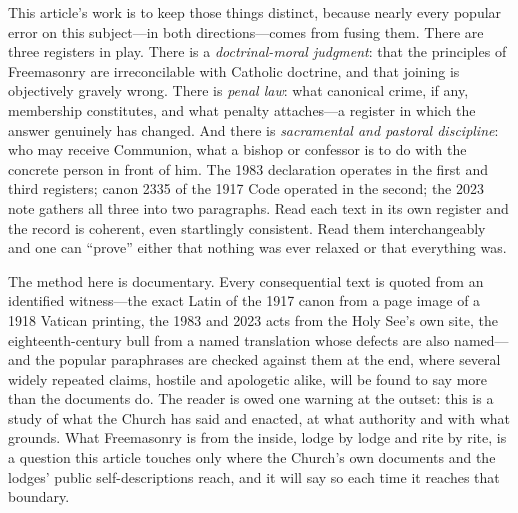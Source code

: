 This article's work is to keep those things distinct, because nearly every popular error on this subject---in both directions---comes from fusing them. There are three registers in play. There is a \emph{doctrinal-moral judgment}: that the principles of Freemasonry are irreconcilable with Catholic doctrine, and that joining is objectively gravely wrong. There is \emph{penal law}: what canonical crime, if any, membership constitutes, and what penalty attaches---a register in which the answer genuinely has changed. And there is \emph{sacramental and pastoral discipline}: who may receive Communion, what a bishop or confessor is to do with the concrete person in front of him. The 1983 declaration operates in the first and third registers; canon 2335 of the 1917 Code operated in the second; the 2023 note gathers all three into two paragraphs. Read each text in its own register and the record is coherent, even startlingly consistent. Read them interchangeably and one can ``prove'' either that nothing was ever relaxed or that everything was.

The method here is documentary. Every consequential text is quoted from an identified witness---the exact Latin of the 1917 canon from a page image of a 1918 Vatican printing, the 1983 and 2023 acts from the Holy See's own site, the eighteenth-century bull from a named translation whose defects are also named---and the popular paraphrases are checked against them at the end, where several widely repeated claims, hostile and apologetic alike, will be found to say more than the documents do. The reader is owed one warning at the outset: this is a study of what the Church has said and enacted, at what authority and with what grounds. What Freemasonry is from the inside, lodge by lodge and rite by rite, is a question this article touches only where the Church's own documents and the lodges' public self-descriptions reach, and it will say so each time it reaches that boundary.
